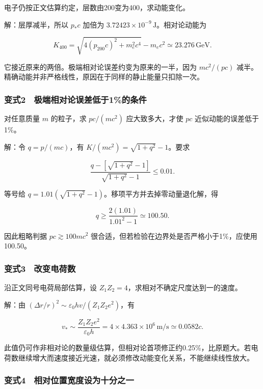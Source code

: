 \documentclass[12pt,a4paper,fontset=fandol]{ctexart}
\begin{document}
电子仍按正文估算约定，层数由200变为400，求动能变化。

解：层厚减半，所以 \(p_*c\) 加倍为
\(3.72423\times10^{-9}\,\mathrm J\)。相对论动能为

\[K_{400}=\sqrt{4(p_{200}c)^2+m_e^2c^4}-m_ec^2
\simeq23.276\,\mathrm{GeV}.\]

它接近原来的两倍。极端相对论误差约变为原来的一半，因为 \(mc^2/(pc)\)
减半。精确动能并非严格线性，原因在于同样的静止能量只扣除一次。

\subsubsection{变式2　极端相对论误差低于1\%的条件}\label{ux53d8ux5f0f2-ux6781ux7aefux76f8ux5bf9ux8bbaux8befux5deeux4f4eux4e8e1ux7684ux6761ux4ef6}

对任意质量 \(m\) 的粒子，求 \(pc/(mc^2)\) 应大致多大，才使 \(pc\)
近似动能的误差低于1\%。

解：令 \(q=p/(mc)\)，有 \(K/(mc^2)=\sqrt{1+q^2}-1\)。要求

\[\frac{q-[\sqrt{1+q^2}-1]}{\sqrt{1+q^2}-1}\le0.01.\]

等号给 \(q=1.01(\sqrt{1+q^2}-1)\)。移项平方并去掉零动量退化解，得

\[\boxed{q\ge\frac{2(1.01)}{1.01^2-1}
\simeq100.50.}\]

因此粗略判据 \(pc\gtrsim100mc^2\)
很合适，但若检验在边界处是否严格小于1\%，应使用100.50。

\subsubsection{变式3　改变电荷数}\label{ux53d8ux5f0f3-ux6539ux53d8ux7535ux8377ux6570}

沿正文同号电荷局部估算，设 \(Z_1Z_2=4\)，求相对不确定尺度达到一的速度。

解：由 \((\Delta r/r)^2\sim\varepsilon_0hv/(Z_1Z_2e^2)\)，有

\[\boxed{v_*\sim\frac{Z_1Z_2e^2}{\varepsilon_0h}
=4\times4.363\times10^6\,\mathrm{m/s}
\simeq0.0582c.}\]

此值仍可作非相对论的数量级估算，但相对论首项修正约0.25\%，比原题大。若电荷数继续增大而速度接近光速，就必须修改动能变化关系，不能继续线性放大。

\subsubsection{变式4　相对位置宽度设为十分之一}\label{ux53d8ux5f0f4-ux76f8ux5bf9ux4f4dux7f6eux5bbdux5ea6ux8bbeux4e3aux5341ux5206ux4e4bux4e00}
\end{document}
